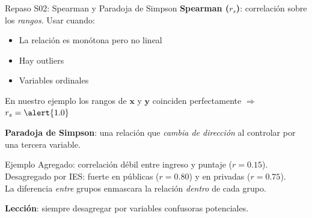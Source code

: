\documentclass[aspectratio=169, 11pt]{beamer}
\begin{document}
\begin{frame}{Repaso S02: Spearman y Paradoja de Simpson}
\textbf{Spearman ($r_s$)}: correlaci\'on sobre los \emph{rangos}. Usar cuando:
\begin{itemize}
  \item La relaci\'on es mon\'otona pero no lineal
  \item Hay outliers
  \item Variables ordinales
\end{itemize}

En nuestro ejemplo los rangos de $\mathbf{x}$ y $\mathbf{y}$ coinciden perfectamente $\Rightarrow$ $r_s = \alert{1.0}$

\vspace{0.5cm}
\textbf{Paradoja de Simpson}: una relaci\'on que \emph{cambia de direcci\'on} al controlar por una tercera variable.

\vspace{0.2cm}
\begin{exampleblock}{Ejemplo}
Agregado: correlaci\'on d\'ebil entre ingreso y puntaje ($r = 0.15$). \\
Desagregado por IES: fuerte en p\'ublicas ($r = 0.80$) y en privadas ($r = 0.75$). \\
La diferencia \emph{entre} grupos enmascara la relaci\'on \emph{dentro} de cada grupo.
\end{exampleblock}

\textbf{Lecci\'on}: \alert{siempre desagregar} por variables confusoras potenciales.
\end{frame}

\end{document}
